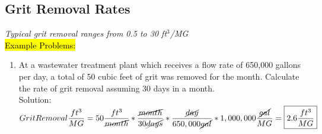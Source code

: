 \subsection{Grit Removal Rates}
\emph{Typical grit removal ranges from 0.5 to 30 ft$^3$/MG}\\
\vspace{0.3cm}
\hl{Example Problems:}\\
\begin{enumerate}[1.]
\item At a wastewater treatment plant which receives a flow rate of 650,000 gallons per day, a total of 50 cubic feet of grit was removed for the month. Calculate the rate of grit removal assuming 30 days in a month.\\
Solution:\\
$Grit Removal\dfrac{ft^3}{MG}=50\dfrac{ft^3}{ \cancel{month}}*\dfrac{\cancel{month}}{30\cancel{days}}*\dfrac{\cancel{day}}{650,000\cancel{gal}}*1,000,000\dfrac{\cancel{gal}}{MG}=\boxed{2.6\dfrac{ft^3}{MG}}$
\end{enumerate}
